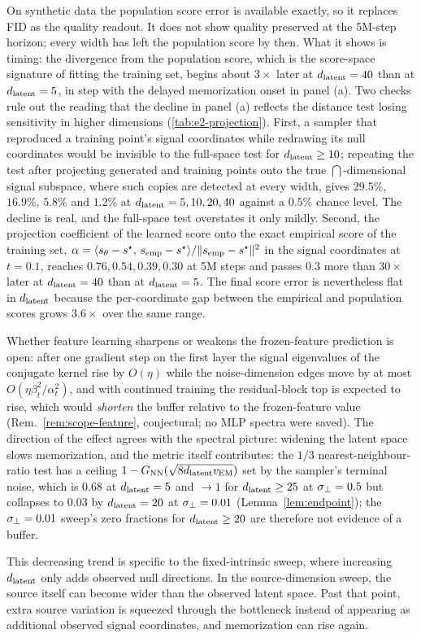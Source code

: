 On synthetic data the population score error is available exactly, so it replaces FID as the quality readout. It does not show quality preserved at the 5M-step horizon; every width has left the population score by then. What it shows is timing: the divergence from the population score, which is the score-space signature of fitting the training set, begins about $3\times$ later at $d_{\mathrm{latent}}=40$ than at $d_{\mathrm{latent}}=5$, in step with the delayed memorization onset in panel (a). Two checks rule out the reading that the decline in panel (a) reflects the distance test losing sensitivity in higher dimensions (\cref{tab:e2-projection}). First, a sampler that reproduced a training point's signal coordinates while redrawing its null coordinates would be invisible to the full-space test for $d_{\mathrm{latent}}\ge10$; repeating the test after projecting generated and training points onto the true $\dint$-dimensional signal subspace, where such copies are detected at every width, gives $29.5\%$, $16.9\%$, $5.8\%$ and $1.2\%$ at $d_{\mathrm{latent}}=5,10,20,40$ against a $0.5\%$ chance level. The decline is real, and the full-space test overstates it only mildly. Second, the projection coefficient of the learned score onto the exact empirical score of the training set, $\alpha=\langle s_\theta-s^\star,\,s_{\rm emp}-s^\star\rangle/\|s_{\rm emp}-s^\star\|^2$ in the signal coordinates at $t=0.1$, reaches $0.76,0.54,0.39,0.30$ at 5M steps and passes $0.3$ more than $30\times$ later at $d_{\mathrm{latent}}=40$ than at $d_{\mathrm{latent}}=5$. The final score error is nevertheless flat in $d_{\mathrm{latent}}$ because the per-coordinate gap between the empirical and population scores grows $3.6\times$ over the same range.

Whether feature learning sharpens or weakens the frozen-feature prediction is open: after one gradient step on the first layer the signal eigenvalues of the conjugate kernel rise by $O(\eta)$ while the noise-dimension edges move by at most $O(\eta\beta_t^2/\alpha_t^2)$, and with continued training the residual-block top is expected to rise, which would \emph{shorten} the buffer relative to the frozen-feature value (Rem.~\ref{rem:scope-feature}, conjectural; no MLP spectra were saved). The direction of the effect agrees with the spectral picture: widening the latent space slows memorization, and the metric itself contributes: the $1/3$ nearest-neighbour-ratio test has a ceiling $1-G_{\rm NN}(\sqrt{8d_{\mathrm{latent}} v_{\rm EM}})$ set by the sampler's terminal noise, which is $0.68$ at $d_{\mathrm{latent}}=5$ and $\to1$ for $d_{\mathrm{latent}}\ge25$ at $\sigma_{\perp}=0.5$ but collapses to $0.03$ by $d_{\mathrm{latent}}=20$ at $\sigma_{\perp}=0.01$ (Lemma~\ref{lem:endpoint}); the $\sigma_{\perp}=0.01$ sweep's zero fractions for $d_{\mathrm{latent}}\ge20$ are therefore not evidence of a buffer.

This decreasing trend is specific to the fixed-intrinsic sweep, where increasing
$d_{\mathrm{latent}}$ only adds observed null directions. In the source-dimension sweep, the
source itself can become wider than the observed latent space. Past that point,
extra source variation is squeezed through the bottleneck instead of appearing
as additional observed signal coordinates, and memorization can rise again.

